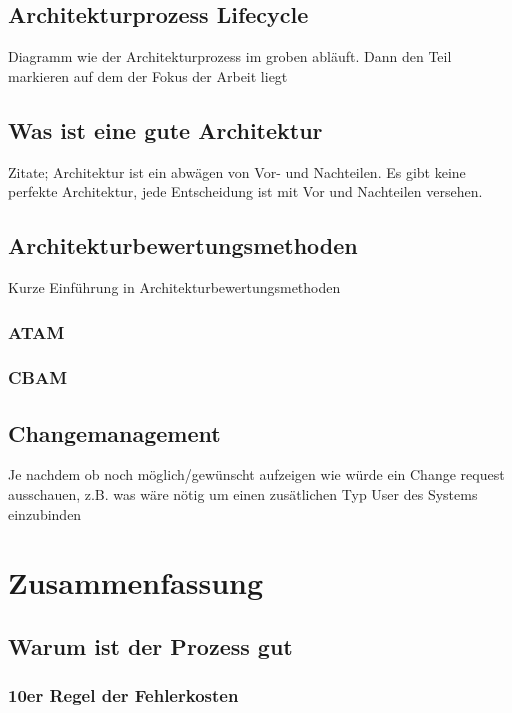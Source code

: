 \documentclass[Master,MSE,german]{twbook}
\begin{document}
\section{Architekturprozess Lifecycle}
Diagramm wie der Architekturprozess im groben abläuft. Dann den Teil markieren auf dem der Fokus der Arbeit liegt

\section{Was ist eine gute Architektur}
Zitate; Architektur ist ein abwägen von Vor- und Nachteilen. Es gibt keine perfekte Architektur, jede Entscheidung ist mit Vor und Nachteilen versehen.

\section{Architekturbewertungsmethoden}
Kurze Einführung in Architekturbewertungsmethoden

\subsection{ATAM}
\subsection{CBAM}





\section{Changemanagement}
Je nachdem ob noch möglich/gewünscht aufzeigen wie würde ein Change request ausschauen, z.B. was wäre nötig um einen zusätlichen Typ User des Systems einzubinden


\chapter{Zusammenfassung}

\section{Warum ist der Prozess gut}
\subsection{10er Regel der Fehlerkosten}
\end{document}
